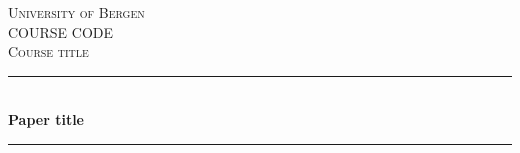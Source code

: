 \begin{titlepage}


    \newcommand{\HRule}{\rule{\linewidth}{0.5mm}} %

    \center %


    \textsc{\LARGE University of Bergen}\\[1.5cm] %
    \textsc{\Large COURSE CODE}\\[0.5cm] %
    \textsc{\large Course title}\\[0.5cm] %


    \HRule \\[0.4cm]
    { \huge \bfseries Paper title}\\[0.4cm] %
    \HRule \\[1.5cm]


\end{titlepage}
